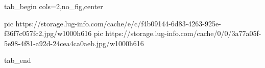  
 
 
 
 


\ifcmt
  tab_begin cols=2,no_fig,center

     pic https://storage.lug-info.com/cache/e/c/f4b09144-6d83-4263-925e-f36f7c057fc2.jpg/w1000h616
		 pic https://storage.lug-info.com/cache/0/0/3a77a05f-5e98-4f81-a92d-24cea4ca0aeb.jpg/w1000h616

  tab_end
\fi

